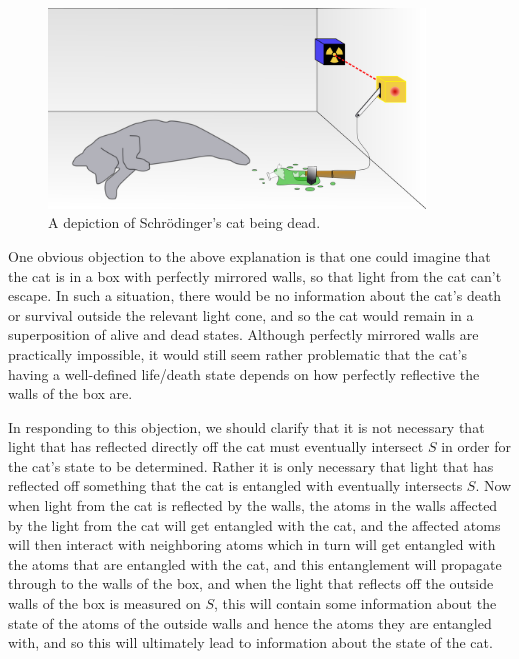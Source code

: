 \documentclass[12pt]{report}
\begin{document}
  \begin{figure}[ht!]
    \captionsetup{justification=justified}
    \centering
    \includegraphics[width=100mm]{Chapter03/Schrodingers_deadcat.png}
    \caption[Depiction of Schr\"{o}dinger's dead cat]{A depiction of Schr\"{o}dinger's cat being dead.\protect\footnotemark}
    \label{deadcat}
    \end{figure}
    
One obvious objection to the above explanation is that one could imagine that the cat is in a box with perfectly mirrored walls, so that light from the cat can't escape. In such a situation, there would be no information about the cat's death or survival outside the relevant light cone, and so the cat would remain in a superposition of alive and dead states. Although perfectly mirrored walls are practically impossible, it would still seem rather problematic that the cat's having a well-defined life/death state depends on how perfectly reflective the walls of the box are. 

In responding to this objection, we should clarify that it is not necessary that light that has reflected directly off the cat must eventually intersect $S$ in order for the cat's state to be determined. Rather it is only necessary that light that has reflected off something that the cat is entangled with eventually intersects $S$. Now when light from the cat is reflected by the walls, the atoms in the walls affected by the light from the cat will get entangled with the cat, and the affected atoms will then interact with neighboring atoms which in turn will get entangled with the atoms that are entangled with the cat, and this entanglement will propagate through to the walls of the box, and when the light that reflects off the outside walls of the box is measured on $S$, this will contain some information about the state of the atoms of the outside walls and hence the atoms they are entangled with, and so this will ultimately lead to information about the state of the cat. 
    
\end{document}
